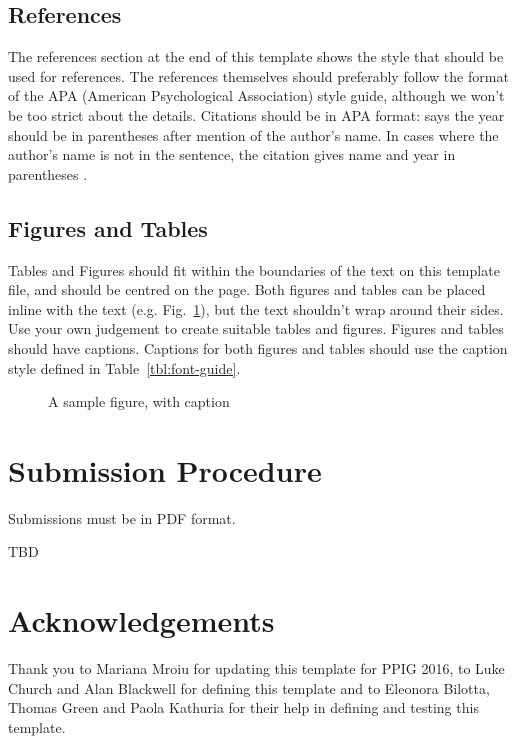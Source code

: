 \documentclass{ppig}
\begin{document}
\subsection{References}

The references section at the end of this template shows the style that should be used for references. The references themselves should preferably follow the format of the APA (American Psychological Association) style guide, although we won't be too strict about the details. Citations should be in APA format:  says the year should be in parentheses after mention of the author's name. In cases where the author's name is not in the sentence, the citation gives name and year in parentheses \cite{blackwell1999how}.

\subsection{Figures and Tables}

Tables and Figures should fit within the boundaries of the text on this template file, and should be centred on the page. Both figures and tables can be placed inline with the text (e.g. Fig.~\ref{fig:sample-figure}), but the text shouldn't wrap around their sides. Use your own judgement to create suitable tables and figures. Figures and tables should have captions. Captions for both figures and tables should use the caption style defined in Table~\ref{tbl:font-guide}.

\begin{figure}[h]
	\centering
	\caption{A sample figure, with caption}
	\label{fig:sample-figure}
\end{figure}

\section{Submission Procedure}

Submissions must be in PDF format.

TBD

\section{Acknowledgements}
Thank you to Mariana Mroiu for updating this template for PPIG 2016, to Luke Church and Alan Blackwell for defining this template and to Eleonora Bilotta, Thomas Green and Paola Kathuria for their help in defining and testing this template.


 
\end{document}
